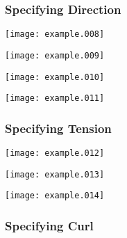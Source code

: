 \documentclass{article}
\newcommand{\figwidth}{0.95\linewidth}
\begin{document}
\subsubsection{Specifying Direction}

\begin{minipage}{\linewidth}
\begin{minipage}{0.48\linewidth}
\texttt{[image: example.008]}
\end{minipage}
\hfill
\begin{minipage}{0.48\linewidth}
\texttt{[image: example.009]}
\end{minipage}
\end{minipage}
\bigskip

\begin{minipage}{\linewidth}
\begin{minipage}{0.48\linewidth}
\texttt{[image: example.010]}
\end{minipage}
\hfill
\begin{minipage}{0.48\linewidth}
\texttt{[image: example.011]}
\end{minipage}
\end{minipage}
\bigskip

\subsubsection{Specifying Tension}

\begin{minipage}{\linewidth}
\begin{minipage}{0.32\linewidth}
\texttt{[image: example.012]}
\end{minipage}
\hfill
\begin{minipage}{0.32\linewidth}
\texttt{[image: example.013]}
\end{minipage}
\hfill
\begin{minipage}{0.32\linewidth}
\texttt{[image: example.014]}
\end{minipage}
\end{minipage}
\bigskip

\subsubsection{Specifying Curl}
\end{document}
